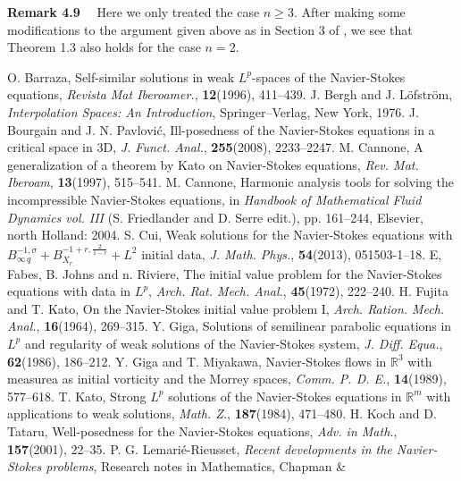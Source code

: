 \documentclass[11pt]{article}
\begin{document}
  {\bf Remark 4.9} \ \ Here we only treated the case $n\geqslant 3$. After making some modifications to the argument given above as in Section 3 of
  \cite{Wang}, we see that Theorem 1.3 also holds for the case $n=2$.


{\small
\begin{thebibliography}{}
 O. Barraza, Self-similar solutions in weak $L^p$-spaces of the Navier-Stokes equations, \textit{Revista Mat Iberoamer.},
 \textbf{12}(1996), 411--439.
 J. Bergh and J. L\"{o}fstr\"{o}m, \textit{Interpolation Spaces: An Introduction}, Springer--Verlag, New York, 1976.
 J. Bourgain and J. N. Pavlovi\'{c}, Ill-posedness of the Navier-Stokes equations in a critical space in 3D, \textit{J. Funct. Anal.},
 \textbf{255}(2008), 2233--2247.
 M. Cannone, A generalization of a theorem by Kato on Navier-Stokes equations, \textit{Rev. Mat. Iberoam}, \textbf{13}(1997), 515--541.
 M. Cannone, Harmonic analysis tools for solving the incompressible Navier-Stokes equations, in \textit{Handbook of Mathematical Fluid
  Dynamics vol. III} (S. Friedlander and D. Serre edit.), pp. 161--244, Elsevier, north Holland:  2004.
 S. Cui, Weak solutions for the Navier-Stokes equations with $B^{-1,\sigma}_{\infty\, q}+B_{X_r}^{-1+r,\frac{2}{1-r}}+L^2$
  initial data, \textit{J. Math. Phys.}, \textbf{54}(2013), 051503-1--18.
 E, Fabes, B. Johns and n. Riviere, The initial value problem for the Navier-Stokes equations with data in $L^p$, \textit{Arch. Rat.
  Mech. Anal.}, \textbf{45}(1972), 222--240.
 H. Fujita and T. Kato, On the Navier-Stokes initial value problem I, \textit{Arch. Ration. Mech. Anal.}, \textbf{16}(1964), 269--315.
 Y. Giga, Solutions of semilinear parabolic equations in $L^p$ and regularity of weak solutions of the Navier-Stokes system, \textit{J.
  Diff. Equa.}, \textbf{62}(1986), 186--212.
 Y. Giga and T. Miyakawa, Navier-Stokes flows in $\mathbb{R}^3$ with measurea as initial vorticity and the Morrey spaces, \textit{Comm.
  P. D. E.}, \textbf{14}(1989), 577--618.
 T. Kato, Strong $L^p$ solutions of the Navier-Stokes equations in $\mathbb{R}^m$ with applications to weak solutions, \textit{Math. Z.},
  \textbf{187}(1984), 471--480.
  H. Koch and D. Tataru, Well-posedness for the Navier-Stokes equations, \textit{Adv. in Math.}, \textbf{157}(2001), 22--35.
 P. G. Lemari\'{e}-Rieusset, \textit{Recent developments in the Navier-Stokes problems}, Research notes in Mathematics, Chapman \&

\end{thebibliography}}
\end{document}
